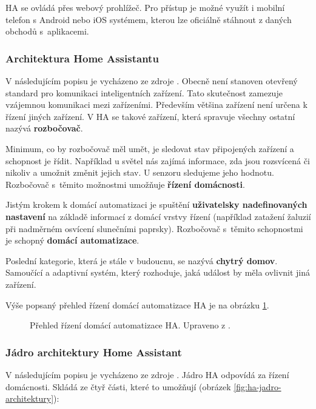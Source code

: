 HA se ovládá přes webový prohlížeč. Pro přístup je možné využít i mobilní telefon s Android nebo iOS systémem, kterou lze oficiálně stáhnout z daných obchodů s~aplikacemi.

\subsubsection{Architektura Home Assistantu}
V následujícím popisu je vycházeno ze zdroje \cite{home-assistant-architektura}. Obecně není stanoven otevřený standard pro komunikaci inteligentních zařízení. Tato skutečnost zamezuje vzájemnou komunikaci mezi zařízeními. Především většina zařízení není určena k řízení jiných zařízení. V HA se takové zařízení, která spravuje všechny ostatní nazývá \textbf{rozbočovač}.

Minimum, co by rozbočovač měl umět, je sledovat stav připojených zařízení a schopnost je řídit. Například u světel nás zajímá informace, zda jsou rozsvícená či nikoliv a umožnit změnit jejich stav. U senzoru sledujeme jeho hodnotu. Rozbočovač s~těmito možnostmi umožňuje \textbf{řízení domácnosti}.

Jistým krokem k domácí automatizaci je spuštění \textbf{uživatelsky nadefinovaných nastavení} na základě informací z domácí vrstvy řízení (například zatažení žaluzií při nadměrném osvícení slunečními paprsky). Rozbočovač s~těmito schopnostmi je schopný \textbf{domácí automatizace}.

Poslední kategorie, která je stále v budoucnu, se nazývá \textbf{chytrý domov}. Samoučící a adaptivní systém, který rozhoduje, jaká událost by měla ovlivnit jiná zařízení.

Výše popsaný přehled řízení domácí automatizace HA je na obrázku \ref{fig:ha-prehled-domaci-autmatizace}.


\begin{figure}[H]
    \centering
    \def\svgwidth{\columnwidth}
    
    \caption[Přehled řízení domácí automatizace HA.]{Přehled řízení domácí automatizace HA. Upraveno z \cite{home-assistant-architektura}.}
    \label{fig:ha-prehled-domaci-autmatizace}
\end{figure}

\subsubsection{Jádro architektury Home Assistant}
V následujícím popisu je vycházeno ze zdroje \cite{home-assistant-jadro-architektury}. Jádro HA odpovídá za řízení domácnosti. Skládá ze čtyř části, které to umožňují (obrázek \ref{fig:ha-jadro-architektury}):


